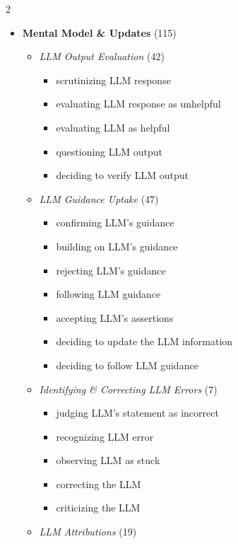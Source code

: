 \begin{multicols}{2}
\begin{itemize}[leftmargin=*, itemsep=2pt, topsep=0pt]
        \columnbreak
        \item \textbf{Mental Model \& Updates} (115)
        \begin{itemize}[leftmargin=*, nosep]
            \item \textit{\ac{LLM} Output Evaluation} (42)
            \begin{itemize}[leftmargin=*, nosep]
                \item scrutinizing \ac{LLM} response
                \item evaluating \ac{LLM} response as unhelpful
                \item evaluating \ac{LLM} as helpful
                \item questioning \ac{LLM} output
                \item deciding to verify \ac{LLM} output
            \end{itemize}
            \item \textit{\ac{LLM} Guidance Uptake} (47)
            \begin{itemize}[leftmargin=*, nosep]
                \item confirming \ac{LLM}'s guidance
                \item building on \ac{LLM}'s guidance
                \item rejecting \ac{LLM}'s guidance
                \item following \ac{LLM} guidance
                \item accepting \ac{LLM}'s assertions
                \item deciding to update the \ac{LLM} information
                \item deciding to follow \ac{LLM} guidance
            \end{itemize}
            \item \textit{Identifying \& Correcting \ac{LLM} Errors} (7)
            \begin{itemize}[leftmargin=*, nosep]
                \item judging \ac{LLM}'s statement as incorrect
                \item recognizing \ac{LLM} error
                \item observing \ac{LLM} as stuck
                \item correcting the \ac{LLM}
                \item criticizing the \ac{LLM}
            \end{itemize}
            \item \textit{\ac{LLM} Attributions} (19)

\end{itemize}
\end{itemize}
\end{multicols}
